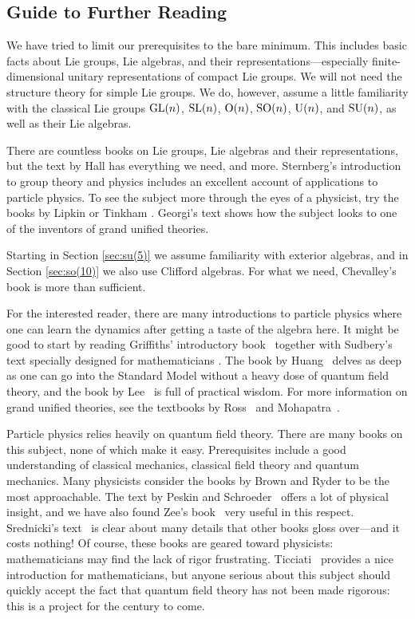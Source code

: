 \documentclass[12pt]{article}
\renewcommand{\O}{{\rm O}}    %
\newcommand{\U}{{\rm U}}    %
\newcommand{\SO}{{\rm SO}}    %
\newcommand{\SU}{{\rm SU}}    %
\newcommand{\GL}{{\rm{GL}}}  %
\newcommand{\SL}{{\rm{SL}}}  %
\begin{document}
\subsection{Guide to Further Reading} \label{subsec:reading}

We have tried to limit our prerequisites to the bare
minimum.  This includes basic facts about Lie groups, Lie
algebras, and their representations---especially finite-dimensional 
unitary representations of compact Lie groups.  We will not need 
the structure theory for simple Lie groups.  We do, however, 
assume a little familiarity with the classical Lie groups 
$\GL(n)$, $\SL(n)$, $\O(n)$, $\SO(n)$, $\U(n)$, and $\SU(n)$, 
as well as their Lie algebras.

There are countless books on Lie groups, Lie algebras and their 
representations, but the text by Hall \cite{hall} has everything we 
need, and more.  Sternberg's introduction to group theory and physics
\cite{sternberg} includes an excellent account of applications 
to particle physics.  To see the subject more through the eyes
of a physicist, try the books by Lipkin \cite{lipkin} or 
Tinkham \cite{tinkham}.  Georgi's text \cite{georgi:lie} shows 
how the subject looks to one of the inventors of grand unified theories. 

Starting in Section \ref{sec:su(5)} we assume familiarity
with exterior algebras, and in Section \ref{sec:so(10)} we
also use Clifford algebras.  For what we need, 
Chevalley's book \cite{Chevalley} is more than sufficient.

For the interested reader, there are many introductions to particle physics
where one can learn the dynamics after getting a taste of the algebra here.  
It might be good to start by reading Griffiths' introductory
book~\cite{griffiths:intro} together with Sudbery's text specially designed for
mathematicians \cite{sudbery}.  The book by Huang~\cite{huang:qlgf} delves as
deep as one can go into the Standard Model without a heavy dose of quantum
field theory, and the book by Lee~\cite{lee:pp} is full of practical wisdom.
For more information on grand unified theories, see the textbooks by
Ross~\cite{ross:gut} and Mohapatra~\cite{mohapatra:us}.

Particle physics relies heavily on quantum field theory. 
There are many books on this subject, none of which make it easy.
Prerequisites include a good understanding of classical mechanics, 
classical field theory and quantum mechanics.  Many physicists 
consider the books by Brown \cite{Brown} and Ryder \cite{Ryder} to 
be the most approachable.  The text by Peskin and 
Schroeder~\cite{PeskinSchroeder:qft} offers a lot of physical insight, 
and we have also found Zee's book~\cite{zee:nutshell} 
very useful in this respect.  Srednicki's text~\cite{srednicki:qft} is clear 
about many details that other books gloss over---and it costs nothing!  Of 
course, these books are geared toward physicists: mathematicians may
find the lack of rigor frustrating.  Ticciati~\cite{ticciati:qft}
provides a nice introduction for mathematicians, but anyone serious
about this subject should quickly accept the fact that quantum field 
theory has not been made rigorous: this is a project for the century to come.
\end{document}
